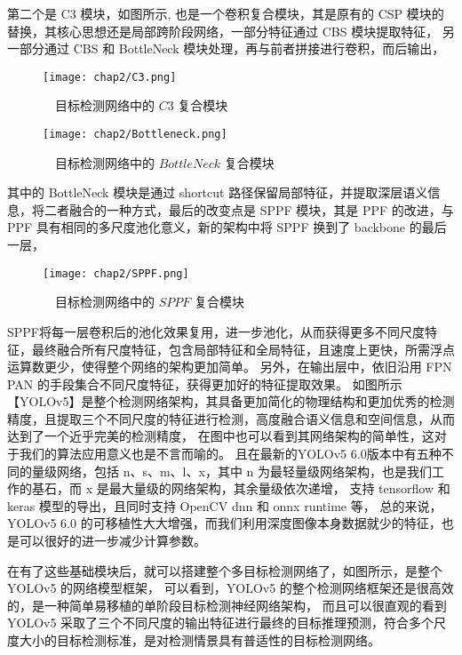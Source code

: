 第二个是 C3 模块，如图所示, 也是一个卷积复合模块，其是原有的 CSP 模块的替换，其核心思想还是局部跨阶段网络，一部分特征通过 CBS 模块提取特征，
另一部分通过 CBS 和 BottleNeck 模块处理，再与前者拼接进行卷积，而后输出，
\vspace{6mm}
\begin{figure}[h]
	\centering
	\texttt{[image: chap2/C3.png]}
	\caption{\ \ 目标检测网络中的 $C3$ 复合模块}
	\label{fig2-2}
\end{figure}
\vspace{3mm}
\vspace{6mm}
\begin{figure}[h]
	\centering
	\texttt{[image: chap2/Bottleneck.png]}
	\caption{\ \ 目标检测网络中的 $BottleNeck$ 复合模块}
	\label{fig2-3}
\end{figure}
\vspace{3mm}
其中的 BottleNeck 模块是通过 shortcut 路径保留局部特征，并提取深层语义信息，将二者融合的一种方式，最后的改变点是 SPPF 模块，其是 PPF 的改进，与 PPF 具有相同的多尺度池化意义，新的架构中将 SPPF 换到了 backbone 的最后一层，
\vspace{6mm}
\begin{figure}[h]
	\centering
	\texttt{[image: chap2/SPPF.png]}
	\caption{\ \ 目标检测网络中的 $SPPF$ 复合模块}
	\label{fig2-4}
\end{figure}
\vspace{3mm}
SPPF将每一层卷积后的池化效果复用，进一步池化，从而获得更多不同尺度特征，最终融合所有尺度特征，包含局部特征和全局特征，且速度上更快，所需浮点运算数更少，使得整个网络的架构更加简单。
另外，在输出层中，依旧沿用 FPN \+ PAN 的手段集合不同尺度特征，获得更加好的特征提取效果。
如图所示【YOLOv5】是整个检测网络架构，其具备更加简化的物理结构和更加优秀的检测精度，且提取三个不同尺度的特征进行检测，高度融合语义信息和空间信息，从而达到了一个近乎完美的检测精度，
在图中也可以看到其网络架构的简单性，这对于我们的算法应用意义也是不言而喻的。
且在最新的YOLOv5 6.0版本中有五种不同的量级网络，包括 n、s、m、l、x，其中 n 为最轻量级网络架构，也是我们工作的基石，而 x 是最大量级的网络架构，其余量级依次递增，
支持 tensorflow 和 keras 模型的导出，且同时支持 OpenCV dnn 和 onnx runtime 等，
总的来说，YOLOv5 6.0 的可移植性大大增强，而我们利用深度图像本身数据就少的特征，也是可以很好的进一步减少计算参数。

在有了这些基础模块后，就可以搭建整个多目标检测网络了，如图所示，是整个 YOLOv5 的网络模型框架，
可以看到，YOLOv5 的整个检测网络框架还是很高效的，是一种简单易移植的单阶段目标检测神经网络架构，
而且可以很直观的看到 YOLOv5 采取了三个不同尺度的输出特征进行最终的目标推理预测，符合多个尺度大小的目标检测标准，是对检测情景具有普适性的目标检测网络。


